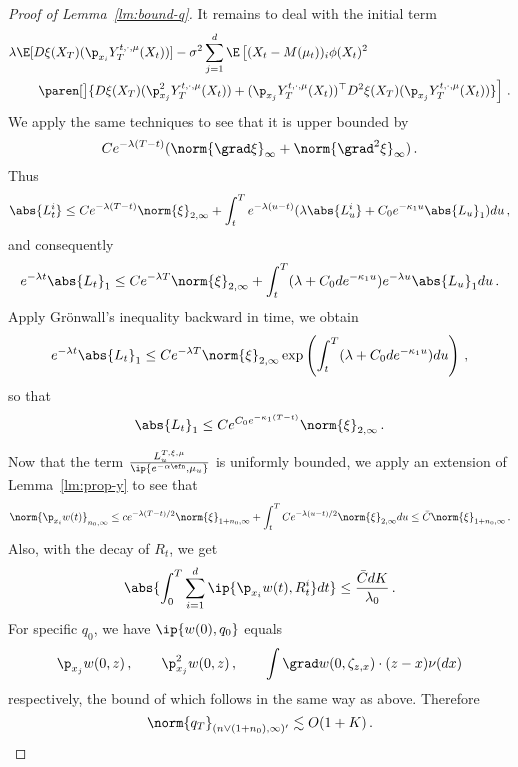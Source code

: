 \documentclass{amsart}
\begin{document}
\begin{proof}[Proof of Lemma~\ref{lm:bound-q}]
	It remains to deal with the initial term 
	\begin{align*}
		& \lambda \E [D\xi(X_T) (\p_{x_i} Y^{t,\cdot,\mu}_T (X_t))] - \sigma^2 \sum_{j=1}^d \E \left[(X_t - M(\mu_t))_i \phi(X_t)^2 \right. \\
		& \qquad \left. \paren[\big]{ D\xi(X_T) (\p_{x_j}^2 Y^{t,\cdot,\mu}_T (X_t)) + (\p_{x_j} Y^{t,\cdot,\mu}_T (X_t))^\top D^2 \xi(X_T) (\p_{x_j} Y^{t,\cdot,\mu}_T(X_t)) } \right] \,.
	\end{align*}
	We apply the same techniques to see that it is upper bounded by 
	\begin{equation*}
		C e^{-\lambda (T-t)} (\norm{\grad \xi}_\infty + \norm{\grad^2 \xi}_\infty) \,.
	\end{equation*}
	Thus 
	\begin{equation*}
		\abs{L^i_t} \le C  e^{-\lambda (T-t)} \norm{\xi}_{2,\infty} + \int_t^T e^{-\lambda(u-t)} (\lambda \abs{L^i_u} + C_0 e^{-\kappa_1 u} \abs{L_u}_1) du \,,
	\end{equation*}
	and consequently 
	\begin{equation*}
		e^{-\lambda t} \abs{L_t}_1 \le C  e^{-\lambda T} \norm{\xi}_{2,\infty} + \int_t^T (\lambda + C_0 d e^{-\kappa_1 u}) e^{-\lambda u} \abs{L_u}_1 du \,.
	\end{equation*}
	Apply Grönwall's inequality backward in time, we obtain 
	\begin{equation*}
		e^{-\lambda t} \abs{L_t}_1 \le C e^{-\lambda T} \norm{\xi}_{2,\infty} \exp \left( \int_t^T (\lambda + C_0 d e^{-\kappa_1 u}) du \right) \,,
	\end{equation*}
	so that 
	\begin{equation*}
		\abs{L_t}_1 \le C e^{C_0 e^{-\kappa_1 (T-t)}} \norm{\xi}_{2,\infty} \,.
	\end{equation*}

	\step[Summary]
	Now that the term $\frac{L^{T,\xi,\mu}_u}{\ip{e^{-\alpha\efn},\mu_u}}$ is uniformly bounded, we apply an extension of Lemma~\ref{lm:prop-y} to see that 
	\begin{equation*}
		\norm{\p_{x_i} w(t)}_{n_0,\infty} \le c e^{-\lambda (T-t)/2} \norm{\xi}_{1+n_0,\infty} + \int_t^T C e^{-\lambda (u-t)/2} \norm{\xi}_{2,\infty} du \le \bar C \norm{\xi}_{1+n_0,\infty} \,.
	\end{equation*}
	Also, with the decay of $R_t$, we get 
	\begin{equation*}
		\abs{ \int_0^T \sum_{i=1}^d \ip{\p_{x_i} w(t), R^i_t} dt } \le \frac{\bar C d K}{\lambda_0} \,.
	\end{equation*}
	For specific $q_0$, we have $\ip{w(0), q_0}$ equals 
	\begin{equation*}
		\p_{x_j} w(0,z) \,, \qquad \p_{x_j}^2 w(0,z) \,, \qquad \int \grad w(0,\zeta_{z,x}) \cdot (z-x) \nu(dx)
	\end{equation*}
	respectively, the bound of which follows in the same way as above. 
	Therefore 
	\begin{equation*}
		\norm{q_T}_{(n \lor (1+n_0),\infty)'} \lesssim O(1+K) \,.
	\end{equation*}
\end{proof}
\end{document}
